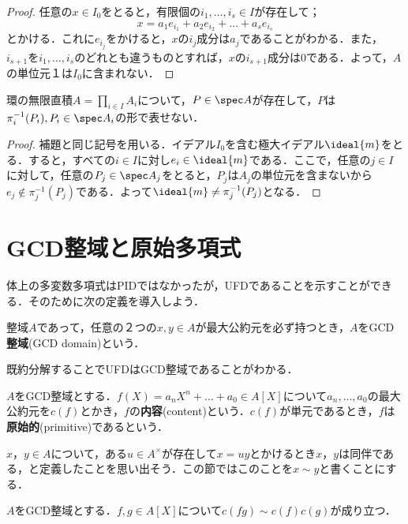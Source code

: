 \begin{proof}
	任意の$x\in I_0$をとると，有限個の$i_1,\dots,i_s\in I$が存在して；
	\[x=a_1e_{i_1}+a_2e_{i_2}+\dots+a_se_{i_s}\]
	とかける．これに$e_{i_j}$をかけると，$x$の$i_j$成分は$a_j$であることがわかる．また，$i_{s+1}$を$i_1,\dots,i_s$のどれとも違うものとすれば，$x$の$i_{s+1}$成分は0である．よって，$A$の単位元$１$は$I_0$に含まれない．
\end{proof}

\begin{prop}
	環の無限直積$A=\prod_{i\in I}A_i$について，$P\in\spec A$が存在して，$P$は$\pi^{-1}_i(P_i),P_i\in\spec A_i$の形で表せない．
\end{prop}

\begin{proof}
	補題と同じ記号を用いる．イデアル$I_0$を含む極大イデアル$\ideal{m}$をとる．すると，すべての$i\in I$に対し$e_i\in\ideal{m}$である．ここで，任意の$j\in I$に対して，任意の$P_j\in\spec A_j$をとると，$P_j$は$A_j$の単位元を含まないから$e_j\not\in\pi^{-1}_j(P_j)$である．よって$\ideal{m}\neq\pi_j^{-1}(P_j)$となる．
\end{proof}

\section{GCD整域と原始多項式}
体上の多変数多項式はPIDではなかったが，UFDであることを示すことができる．そのために次の定義を導入しよう．

\begin{defi}[GCD整域]\label{defi:GCDdomain}
	整域$A$であって，任意の２つの$x,y\in A$が最大公約元を必ず持つとき，$A$をGCD\textbf{整域}(GCD domain)という．
\end{defi}

既約分解することでUFDはGCD整域であることがわかる．

\begin{defi}[内容，原始多項式]
	$A$をGCD整域とする．$f(X)=a_nX^n+\dots+a_0\in A[X]$について$a_n,\dots,a_0$の最大公約元を$c(f)$とかき，$f$の\textbf{内容}(content)という．$c(f)$が単元であるとき，$f$は\textbf{原始的}(primitive)であるという．
\end{defi}

$x，y\in A$について，ある$u\in A^\times$が存在して$x=uy$とかけるとき$x，y$は同伴である，と定義したことを思い出そう．この節ではこのことを$x\sim y$と書くことにする．
\begin{lem}[Gaussの補題]
	$A$をGCD整域とする．$f,g\in A[X]$について$c(fg)\sim c(f)c(g)$が成り立つ．
\end{lem}

